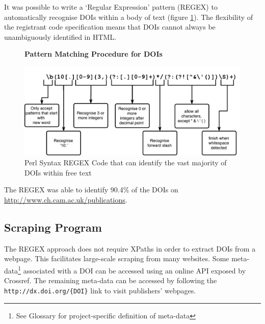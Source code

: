 It was possible to write a `Regular Expression' pattern (REGEX) to automatically recognise DOIs within a body of text (figure \ref{fig:REGEX}). The flexibility of the registrant code specification means that DOIs cannot always be unambiguously identified in HTML. 
\begin{figure}[H]
    \centering
    \textbf{Pattern Matching Procedure for DOIs}\par\medskip
    \includegraphics[width=\textwidth]{Data_Acquisition/Regex.pdf}
    \caption[Pattern Matching Procdure for DOIs]{Perl Syntax REGEX Code that can identify the vast majority of DOIs within free text} \label{fig:REGEX}
\end{figure}
The REGEX was able to identify 90.4\% of the DOIs on \url{http://www.ch.cam.ac.uk/publications}. 
\subsection{Scraping Program}
\label{sec:SCRAPING_PROGRAM}
The REGEX approach does not require XPaths in order to extract DOIs from a webpage. This facilitates large-scale scraping from many websites. Some meta-data\footnote{See Glossary for project-specific definition of meta-data} associated with a DOI can be accessed using an online API exposed by Crossref. The remaining meta-data can be accessed by following the \texttt{http://dx.doi.org/\{DOI\}} link to visit publishers' webpages.

